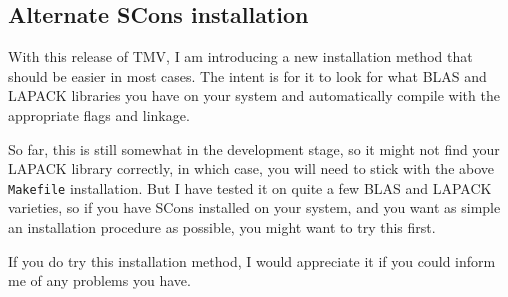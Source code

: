 \documentclass[twoside,letterpaper,11pt]{article}
\begin{document}
\subsection{Alternate SCons installation}
\label{scons}

With this release of TMV, I am introducing a new installation method that should be 
easier in most cases.  The intent is for it to look for what BLAS and LAPACK libraries
you have on your system and automatically compile with the appropriate flags and linkage.

So far, this is still somewhat in the development stage, so it might not find your LAPACK
library correctly, in which case, you will need to stick with the above \texttt{Makefile} installation.
But I have tested it on quite a few BLAS and LAPACK varieties, so
if you have SCons installed on your system, 
and you want as simple an installation procedure as possible, you might want to 
try this first.

If you do try this installation method, I would appreciate it if you could inform me of any problems 
you have.
\end{document}
